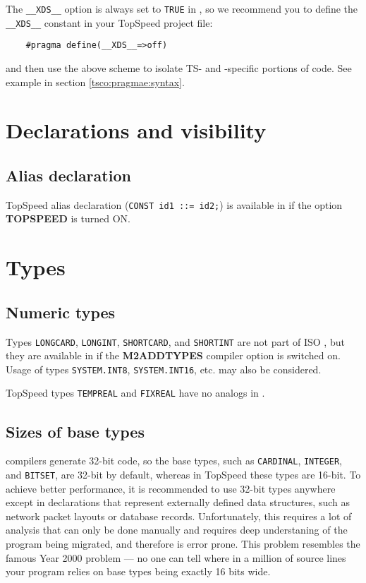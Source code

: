 The \verb'__XDS__' option is always set to \verb'TRUE' in \XDS{} \mt{}, so
we recommend you to define the \verb'__XDS__' constant in your TopSpeed project
file:

\verb'    #pragma define(__XDS__=>off)'

and then use the above scheme to isolate TS- and \XDS{}-specific portions of
code. See example in section \ref{tsco:pragmae:syntax}.


\section{Declarations and visibility}

\subsection{Alias declaration}

    TopSpeed alias declaration (\verb'CONST id1 ::= id2;') is available in
    \XDS{} if the option {\bf TOPSPEED} is turned ON.

\section{Types}

\subsection{Numeric types}

    Types \verb'LONGCARD', \verb'LONGINT', \verb'SHORTCARD', and 
    \verb'SHORTINT' are not part of ISO \mt{}, but they are available
    in \xds{} \mt{} if the {\bf M2ADDTYPES} compiler option is switched on.
    Usage of types \verb'SYSTEM.INT8', \verb'SYSTEM.INT16', etc. may 
    also be considered.

    TopSpeed \mt{} types \verb'TEMPREAL' and \verb'FIXREAL' have no analogs
    in \xds{}.

\subsection{Sizes of base types}

    \xds{} compilers generate 32-bit code, so the base \mt{}
    types, such as \verb'CARDINAL', \verb'INTEGER', and \verb'BITSET',
    are 32-bit by default, whereas in TopSpeed \mt{} these types are 16-bit.
    To achieve better performance, it is recommended to use 32-bit types 
    anywhere except in declarations that represent externally defined 
    data structures, such as network packet layouts or database records. 
    Unfortunately, this requires a lot of analysis that can only be done
    manually and requires deep understaning of the program being migrated,
    and therefore is error prone. This problem resembles the famous Year 2000 
    problem --- no one can tell where in a million of source lines your 
    program relies on base types being exactly 16 bits wide.

